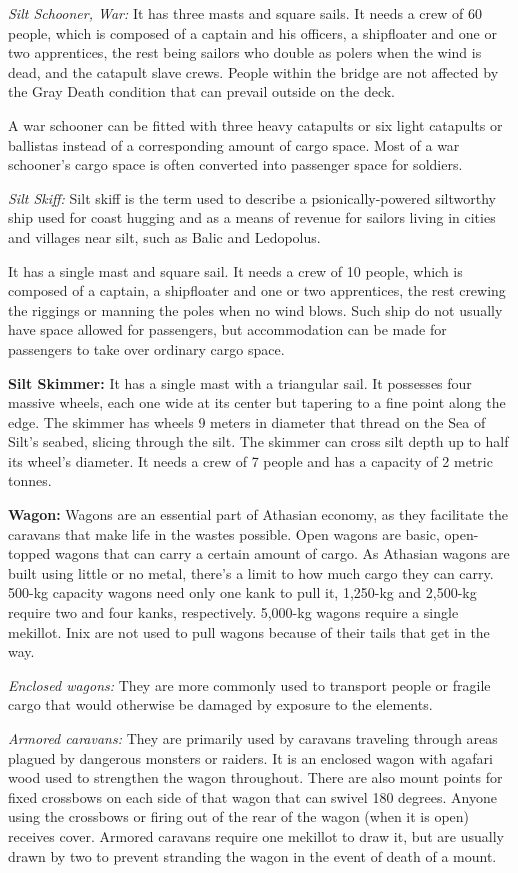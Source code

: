 \textit{Silt Schooner, War:} It has three masts and square sails. It needs a crew of 60 people, which is composed of a captain and his officers, a shipfloater and one or two apprentices, the rest being sailors who double as polers when the wind is dead, and the catapult slave crews. People within the bridge are not affected by the Gray Death condition that can prevail outside on the deck.

A war schooner can be fitted with three heavy catapults or six light catapults or ballistas instead of a corresponding amount of cargo space. Most of a war schooner's cargo space is often converted into passenger space for soldiers.

\textit{Silt Skiff:} Silt skiff is the term used to describe a psionically-powered siltworthy ship used for coast hugging and as a means of revenue for sailors living in cities and villages near silt, such as Balic and Ledopolus.

It has a single mast and square sail. It needs a crew of 10 people, which is composed of a captain, a shipfloater and one or two apprentices, the rest crewing the riggings or manning the poles when no wind blows. Such ship do not usually have space allowed for passengers, but accommodation can be made for passengers to take over ordinary cargo space.

\textbf{Silt Skimmer:} It has a single mast with a triangular sail. It possesses four massive wheels, each one wide at its center but tapering to a fine point along the edge. The skimmer has wheels 9 meters in diameter that thread on the Sea of Silt's seabed, slicing through the silt. The skimmer can cross silt depth up to half its wheel's diameter. It needs a crew of 7 people and has a capacity of 2 metric tonnes.

\textbf{Wagon:} Wagons are an essential part of Athasian economy, as they facilitate the caravans that make life in the wastes possible. Open wagons are basic, open-topped wagons that can carry a certain amount of cargo. As Athasian wagons are built using little or no metal, there's a limit to how much cargo they can carry. 500-kg capacity wagons need only one kank to pull it, 1,250-kg and 2,500-kg require two and four kanks, respectively. 5,000-kg wagons require a single mekillot. Inix are not used to pull wagons because of their tails that get in the way.

\textit{Enclosed wagons:} They are more commonly used to transport people or fragile cargo that would otherwise be damaged by exposure to the elements.

\textit{Armored caravans:} They are primarily used by caravans traveling through areas plagued by dangerous monsters or raiders. It is an enclosed wagon with agafari wood used to strengthen the wagon throughout. There are also mount points for fixed crossbows on each side of that wagon that can swivel 180 degrees. Anyone using the crossbows or firing out of the rear of the wagon (when it is open) receives cover. Armored caravans require one mekillot to draw it, but are usually drawn by two to prevent stranding the wagon in the event of death of a mount.
